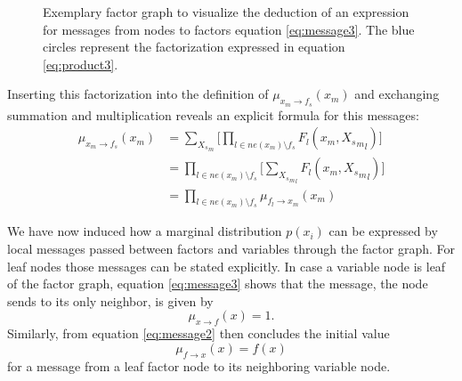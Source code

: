 \documentclass{sigkdd}
\begin{document}
\begin{figure}[h]
	\centering
	\caption{Exemplary factor graph to visualize the deduction of an expression for messages from nodes to factors equation \ref{eq:message3}. The blue circles represent the factorization expressed in equation  \ref{eq:product3}.}\label{fig:message3}
\end{figure}

Inserting this factorization into the definition of $\mu_{x_m \rightarrow f_s}(x_m)$ and exchanging summation and multiplication reveals an explicit formula for this messages:
\begin{equation}\label{eq:message3}
    \begin{split}
        \mu_{x_m \rightarrow f_s}(x_m) &=\sum_{{X_s}_m} \Big[ \prod_{l \in ne(x_m) \setminus f_s} F_l(x_m, {{X_s}_m}_l) \Big] \\ &= \prod_{l \in ne(x_m) \setminus f_s} \Big[\sum_{{{X_s}_m}_l} F_l(x_m, {{X_s}_m}_l) \Big] \\ &= \prod_{l \in ne(x_m) \setminus f_s} \mu_{f_l \rightarrow x_m}(x_m)
    \end{split}
\end{equation}

We have now induced how a marginal distribution $p(x_i)$ can be expressed by local messages passed between factors and variables through the factor graph. For leaf nodes those messages can be stated explicitly.
In case a variable node is leaf of the factor graph, equation \ref{eq:message3} shows that the message, the node sends to its only neighbor, is given by
\begin{equation}\label{eq:marg_init_1}
\mu_{x \rightarrow f}(x) = 1.
\end{equation}
Similarly, from equation \ref{eq:message2} then concludes the initial value
\begin{equation}\label{eq:marg_init_2}
\mu_{f \rightarrow x}(x) = f(x)
\end{equation}
for a message from a leaf factor node to its neighboring variable node.
\end{document}
